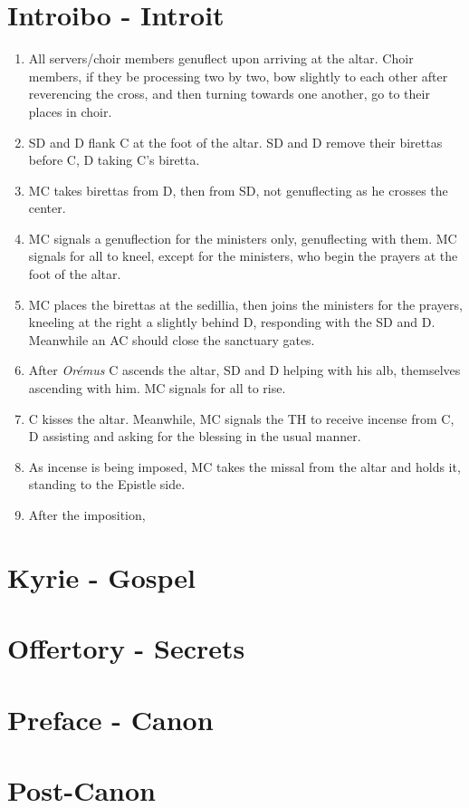 \documentclass[letterpaper, twocolumn]{article}
\begin{document}
	\section*{Introibo - Introit}
	\begin{enumerate}
		\item All servers/choir members genuflect upon arriving at the altar. Choir members, if they be processing two by two, bow slightly to each other after reverencing the cross, and then turning towards one another, go to their places in choir.
		\item SD and D flank C at the foot of the altar. SD and D remove their birettas before C, D taking C's biretta.
		\item MC takes birettas from D, then from SD, not genuflecting as he crosses the center.
		\item MC signals a genuflection for the ministers only, genuflecting with them. MC signals for all to kneel, except for the ministers, who begin the prayers at the foot of the altar.
		\item MC places the birettas at the sedillia, then joins the ministers for the prayers, kneeling at the right a slightly behind D, responding with the SD and D. Meanwhile an AC should close the sanctuary gates.
		\item After \textit{Orémus} C ascends the altar, SD and D helping with his alb, themselves ascending with him. MC signals for all to rise.
		\item C kisses the altar. Meanwhile, MC signals the TH to receive incense from C, D assisting and asking for the blessing in the usual manner.
		\item As incense is being imposed, MC takes the missal from the altar and holds it, standing to the Epistle side. 
		\item After the imposition, 
	\end{enumerate}
	\section*{Kyrie - Gospel}
	\section*{Offertory - Secrets}
	\section*{Preface - Canon}
	\section*{Post-Canon}
\end{document}
